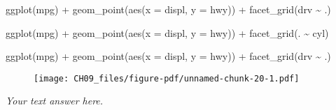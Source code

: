 \documentclass[
  letterpaper,
  DIV=11,
  numbers=noendperiod]{scrreprt}
\newenvironment{Shaded}{\begin{snugshade}}{\end{snugshade}}
\newcommand{\AttributeTok}[1]{\textcolor[rgb]{0.40,0.45,0.13}{#1}}
\newcommand{\FunctionTok}[1]{\textcolor[rgb]{0.28,0.35,0.67}{#1}}
\newcommand{\NormalTok}[1]{\textcolor[rgb]{0.00,0.23,0.31}{#1}}
\newcommand{\SpecialCharTok}[1]{\textcolor[rgb]{0.37,0.37,0.37}{#1}}
\begin{document}
\begin{enumerate}
\begin{Shaded}
\begin{Highlighting}[]
\FunctionTok{ggplot}\NormalTok{(mpg) }\SpecialCharTok{+} 
  \FunctionTok{geom\_point}\NormalTok{(}\FunctionTok{aes}\NormalTok{(}\AttributeTok{x =}\NormalTok{ displ, }\AttributeTok{y =}\NormalTok{ hwy)) }\SpecialCharTok{+}
  \FunctionTok{facet\_grid}\NormalTok{(drv }\SpecialCharTok{\textasciitilde{}}\NormalTok{ .)}
\end{Highlighting}
\end{Shaded}

\begin{Shaded}
\begin{Highlighting}[]
\FunctionTok{ggplot}\NormalTok{(mpg) }\SpecialCharTok{+} 
  \FunctionTok{geom\_point}\NormalTok{(}\FunctionTok{aes}\NormalTok{(}\AttributeTok{x =}\NormalTok{ displ, }\AttributeTok{y =}\NormalTok{ hwy)) }\SpecialCharTok{+}
  \FunctionTok{facet\_grid}\NormalTok{(. }\SpecialCharTok{\textasciitilde{}}\NormalTok{ cyl)}
\end{Highlighting}
\end{Shaded}

  \begin{tcolorbox}[enhanced jigsaw, breakable, bottomtitle=1mm, left=2mm, colback=white, toprule=.15mm, leftrule=.75mm, colframe=quarto-callout-note-color-frame, colbacktitle=quarto-callout-note-color!10!white, title={Answer}, coltitle=black, toptitle=1mm, bottomrule=.15mm, opacitybacktitle=0.6, arc=.35mm, rightrule=.15mm, titlerule=0mm, opacityback=0]

\begin{Shaded}
\begin{Highlighting}[]
\FunctionTok{ggplot}\NormalTok{(mpg) }\SpecialCharTok{+} 
  \FunctionTok{geom\_point}\NormalTok{(}\FunctionTok{aes}\NormalTok{(}\AttributeTok{x =}\NormalTok{ displ, }\AttributeTok{y =}\NormalTok{ hwy)) }\SpecialCharTok{+}
  \FunctionTok{facet\_grid}\NormalTok{(drv }\SpecialCharTok{\textasciitilde{}}\NormalTok{ .)}
\end{Highlighting}
\end{Shaded}

  \begin{figure}[H]

  {\centering \texttt{[image: CH09\_files/figure-pdf/unnamed-chunk-20-1.pdf]}

  }

  \end{figure}

  \emph{Your text answer here.}


\end{tcolorbox}
\end{enumerate}
\end{document}

